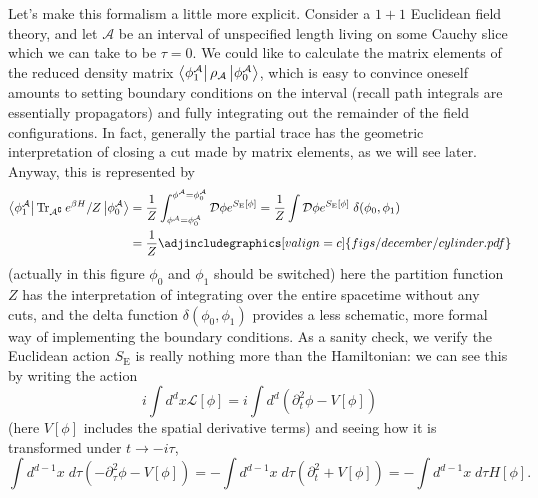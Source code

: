 \documentclass{report}
\begin{document}
Let's make this formalism a little more explicit. Consider a $ 1+1 $ Euclidean 
field theory, and let $ \mathcal{A} $ be an interval of unspecified length living 
on some Cauchy slice which we can take to be $ \tau=0 $. We could like to 
calculate the matrix elements of the reduced density matrix $ \bra{\phi_1^\mathcal{A}}
\rho_{\mathcal{A}} \ket{\phi_0^\mathcal{A}} $, which is easy to convince oneself
amounts to setting boundary conditions on the interval (recall path integrals are 
essentially propagators) and fully integrating out the remainder of the field
configurations. In fact, generally the partial trace has the geometric 
interpretation of closing a cut made by matrix elements, as we will see later. 
Anyway, this is represented by 
\begin{align}
	\bra{\phi_1^\mathcal{A}} \Tr_{\mathcal{A}^\complement} e^{\beta H}/Z \ket{\phi_0^\mathcal{A}}
		&= \frac{1}{Z} \int_{\phi^\mathcal{A} = \phi^\mathcal{A}_0}^{\phi^\mathcal{A} = \phi^\mathcal{A}_0}
			\mathcal{D} \phi e^{S_{\text{E}}[\phi]}
		= \frac{1}{Z} \int
			\mathcal{D} \phi e^{S_{\text{E}}[\phi]} \; \delta (\phi_0,\phi_1)\nonumber\\ 
		&= \frac{1}{Z}\adjincludegraphics[valign=c]{figs/december/cylinder.pdf}\label{eq:entanglement-path-integral}
\end{align}
(actually in this figure $ \phi_0 $ and $ \phi_1 $ should be switched)
here the partition function $ Z $ has the interpretation of integrating over the
entire spacetime without any cuts, and the delta function $ \delta(\phi_0,\phi_1) $
provides a less schematic, more formal way of implementing the boundary
conditions. As a sanity check, we verify the Euclidean action $ S_{\text{E}} $
is really nothing more than the Hamiltonian: we can see this by writing the
action 
\begin{equation*}
	i \int d^d x \mathcal{L}[\phi]
		= i \int d^d \left(\partial_t^2 \phi - V[\phi]\right)
\end{equation*}
(here $ V[\phi] $ includes the spatial derivative terms) and seeing how 
it is transformed under $ t \rightarrow -i\tau $, 
\begin{equation*}
	\int d^{d-1}x \; d\tau \left(-\partial_\tau^2 \phi - V[\phi]\right)
		= - \int d^{d-1} x \; d\tau (\partial_t^2 + V[\phi])
		= -\int d^{d-1}x \; d\tau H[\phi].
\end{equation*}
 
\end{document}
